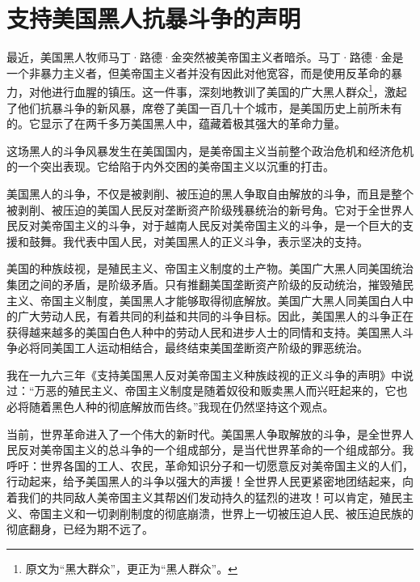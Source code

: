 \section{支持美国黑人抗暴斗争的声明}

最近，美国黑人牧师马丁·路德·金突然被美帝国主义者暗杀。马丁·路德·金是一个非暴力主义者，但美帝国主义者并没有因此对他宽容，而是使用反革命的暴力，对他进行血腥的镇压。这一件事，深刻地教训了美国的广大黑人群众\footnote{原文为“黑大群众”，更正为“黑人群众”。}，激起了他们抗暴斗争的新风暴，席卷了美国一百几十个城市，是美国历史上前所未有的。它显示了在两千多万美国黑人中，蕴藏着极其强大的革命力量。

这场黑人的斗争风暴发生在美国国内，是美帝国主义当前整个政治危机和经济危机的一个突出表现。它给陷于内外交困的美帝国主义以沉重的打击。

美国黑人的斗争，不仅是被剥削、被压迫的黑人争取自由解放的斗争，而且是整个被剥削、被压迫的美国人民反对垄断资产阶级残暴统治的新号角。它对于全世界人民反对美帝国主义的斗争，对于越南人民反对美帝国主义的斗争，是一个巨大的支援和鼓舞。我代表中国人民，对美国黑人的正义斗争，表示坚决的支持。

美国的种族歧视，是殖民主义、帝国主义制度的土产物。美国广大黑人同美国统治集团之间的矛盾，是阶级矛盾。只有推翻美国垄断资产阶级的反动统治，摧毁殖民主义、帝国主义制度，美国黑人才能够取得彻底解放。美国广大黑人同美国白人中的广大劳动人民，有着共同的利益和共同的斗争目标。因此，美国黑人的斗争正在获得越来越多的美国白色人种中的劳动人民和进步人士的同情和支持。美国黑人斗争必将同美国工人运动相结合，最终结束美国垄断资产阶级的罪恶统治。

我在一九六三年《支持美国黑人反对美帝国主义种族歧视的正义斗争的声明》中说过：“万恶的殖民主义、帝国主义制度是随着奴役和贩卖黑人而兴旺起来的，它也必将随着黑色人种的彻底解放而告终。”我现在仍然坚持这个观点。

当前，世界革命进入了一个伟大的新时代。美国黑人争取解放的斗争，是全世界人民反对美帝国主义的总斗争的一个组成部分，是当代世界革命的一个组成部分。我呼吁：世界各国的工人、农民，革命知识分子和一切愿意反对美帝国主义的人们，行动起来，给予美国黑人的斗争以强大的声援！全世界人民更紧密地团结起来，向着我们的共同敌人美帝国主义其帮凶们发动持久的猛烈的进攻！可以肯定，殖民主义、帝国主义和一切剥削制度的彻底崩溃，世界上一切被压迫人民、被压迫民族的彻底翻身，已经为期不远了。